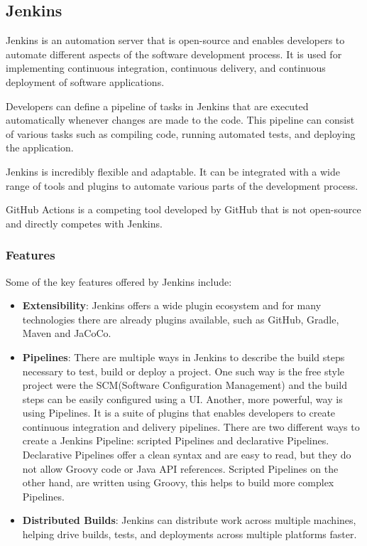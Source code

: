 \subsection{Jenkins}\label{subsec:jenkins}
Jenkins is an automation server that is open-source and enables developers to automate different aspects of the software development process.
It is used for implementing continuous integration, continuous delivery, and continuous deployment of software applications.\cite{jenkins-docs}

Developers can define a pipeline of tasks in Jenkins that are executed automatically whenever changes are made to the code.
This pipeline can consist of various tasks such as compiling code, running automated tests, and deploying the application.

Jenkins is incredibly flexible and adaptable.
It can be integrated with a wide range of tools and plugins to automate various parts of the development process.

GitHub Actions is a competing tool developed by GitHub that is not open-source and directly competes with Jenkins.

\subsubsection{Features}\label{subsubsec:jenkins-features}
Some of the key features offered by Jenkins include:

\begin{itemize}
    \item\textbf{Extensibility}: Jenkins offers a wide plugin ecosystem and for many technologies there are already plugins available, such as GitHub, Gradle, Maven and JaCoCo.
    \item\textbf{Pipelines}: There are multiple ways in Jenkins to describe the build steps necessary to test, build or deploy a project.
    One such way is the free style project were the SCM(Software Configuration Management) and the build steps can be easily configured using a UI\@.
    Another, more powerful, way is using Pipelines.
    It is a suite of plugins that enables developers to create continuous integration and delivery pipelines.
    There are two different ways to create a Jenkins Pipeline: scripted Pipelines and declarative Pipelines.
    Declarative Pipelines offer a clean syntax and are easy to read, but they do not allow Groovy code or Java API references.
    Scripted Pipelines on the other hand, are written using Groovy, this helps to build more complex Pipelines.\cite{jenkins-docs}
    \item\textbf{Distributed Builds}: Jenkins can distribute work across multiple machines, helping drive builds, tests, and deployments across multiple platforms faster.\cite{jenkins-docs}
\end{itemize}

